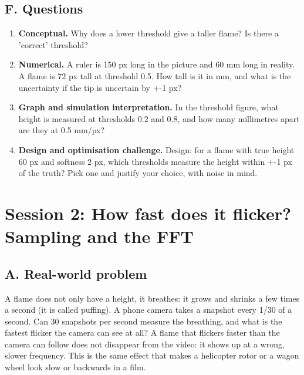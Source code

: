 \documentclass[11pt,a4paper]{article}
\begin{document}
\subsection*{F. Questions}
\begin{enumerate}[nosep]
\item \textbf{Conceptual.} Why does a lower threshold give a taller flame? Is there a 'correct' threshold?
\item \textbf{Numerical.} A ruler is 150 px long in the picture and 60 mm long in reality. A flame is 72 px tall at threshold 0.5. How tall is it in mm, and what is the uncertainty if the tip is uncertain by +-1 px?
\item \textbf{Graph and simulation interpretation.} In the threshold figure, what height is measured at thresholds 0.2 and 0.8, and how many millimetres apart are they at 0.5 mm/px?
\item \textbf{Design and optimisation challenge.} Design: for a flame with true height 60 px and softness 2 px, which thresholds measure the height within +-1 px of the truth? Pick one and justify your choice, with noise in mind.
\end{enumerate}

\section{Session 2: How fast does it flicker? Sampling and the FFT}

\subsection*{A. Real-world problem}
A flame does not only have a height, it breathes: it grows and shrinks a few times a second (it is called puffing). A phone camera takes a snapshot every 1/30 of a second. Can 30 snapshots per second measure the breathing, and what is the fastest flicker the camera can see at all? A flame that flickers faster than the camera can follow does not disappear from the video: it shows up at a wrong, slower frequency. This is the same effect that makes a helicopter rotor or a wagon wheel look slow or backwards in a film.
\end{document}
